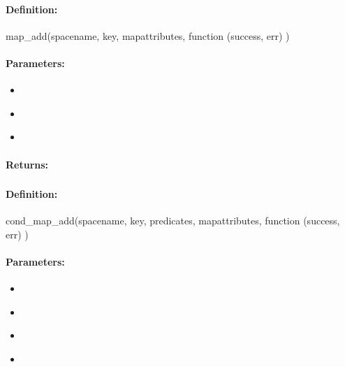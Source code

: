 \paragraph{Definition:}
\begin{javascriptcode}
map_add(spacename, key, mapattributes, function (success, err) {})
\end{javascriptcode}
\paragraph{Parameters:}
\begin{itemize}[noitemsep]
\item {}\\

\item {}\\

\item {}\\

\end{itemize}

\paragraph{Returns:}


\pagebreak
\subsubsection{}
\label{api:nodejs:cond_map_add}


\paragraph{Definition:}
\begin{javascriptcode}
cond_map_add(spacename, key, predicates, mapattributes, function (success, err) {})
\end{javascriptcode}
\paragraph{Parameters:}
\begin{itemize}[noitemsep]
\item {}\\

\item {}\\

\item {}\\

\item {}\\

\end{itemize}

